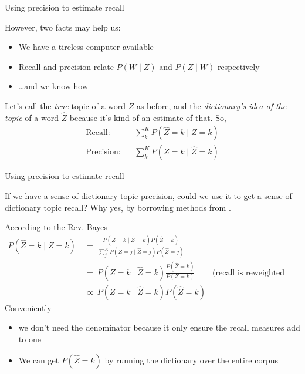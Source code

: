 \documentclass{hertieteaching}
\begin{document}
\begin{frame}{Using precision to estimate recall}


However, two facts may help us:
\begin{itemize}
  \item We have a tireless computer available
  \item Recall and precision relate $P(W \mid Z)$ and $P(Z \mid W)$ respectively
  \item \ldots and we know how
\end{itemize}

Let's call the \textit{true} topic of a word $Z$ as before, and the \textit{dictionary's idea of the topic} of a word $\hat{Z}$ because it's kind of an estimate of that. So,
\begin{align*}
\text{Recall:} & ~~~~ \sum^K_k P(\hat{Z}=k \mid Z=k)\\
\text{Precision:} & ~~~~ \sum^K_k P(Z=k \mid \hat{Z}=k)
\end{align*}

\end{frame}

\begin{frame}{Using precision to estimate recall}

If we have a sense of dictionary topic precision, could we use it to get a sense of dictionary topic recall? \pause Why yes, by borrowing methods from \textcite{King.Lowe2003}.
\pause

According to the Rev. Bayes
\begin{align*}
P(\hat{Z}=k \mid Z=k) &~=~ \frac{P(Z=k \mid \hat{Z}=k) P(\hat{Z}=k)}{\sum^K_j P(Z=j \mid \hat{Z}=j) P(\hat{Z}=j)} \\
                      &~=~ P(Z=k \mid \hat{Z}=k) \frac{P(\hat{Z}=k)}{P(Z=k)}& \text{(recall is reweighted precision)}\\
                      &~\propto~ P(Z=k \mid \hat{Z}=k) P(\hat{Z}=k) 
\end{align*}
Conveniently
\begin{itemize}
  \item we don't need the denominator because it only ensure the recall measures add to one
  \item We can get $P(\hat{Z}=k)$ by running the dictionary over the entire corpus
\end{itemize}
  
\end{frame}
\end{document}
